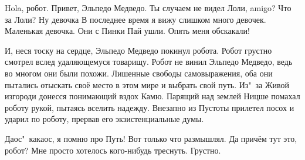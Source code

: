 {\small 
\begin{dialog}
\X Hola, робот.
\R Привет, Эльпедо Медведо.
\X Ты случаем не видел Лоли, amigo?
\R Что за Лоли?
\X Ну девочка\ldotst{}
\R В последнее время я вижу слишком много девочек.
\X Маленькая девочка.
\R Они с Пинки Пай ушли.
\X Опять меня обскакали!
\end{dialog}

\begin{monolog}
И, неся тоску на сердце, Эльпедо Медведо покинул робота. Робот грустно смотрел вслед удаляющемуся товарищу. Робот не винил Эльпедо Медведо, ведь во многом они были похожи. Лишенные свободы самовыражения, оба они пытались отыскать своё место в этом мире и выбрать свой путь. Из"~за Живой изгороди донесся понимающий вздох Камю. Парящий над землей Ницше помахал роботу рукой, пытаясь вселить надежду. Внезапно из Пустоты прилетел посох и ударил по роботу, прервав его экзистенциальные думы.
\end{monolog}

\begin{dialog}
\X Даос"~какаос, я помню про Путь! Вот только что размышлял.
\R Да причём тут это, робот? Мне просто хотелось кого-нибудь треснуть.
\X Грустно.
\end{dialog}
}